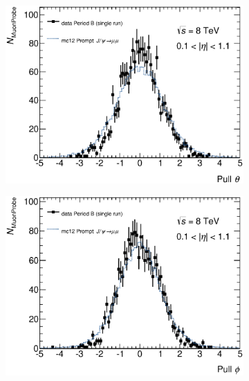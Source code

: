 \begin{figure}[htbp]
  \centering
    \begin{subfigure}[b]{0.49\textwidth}
      \includegraphics[width=\textwidth]{PartCalibration2012/Plots/DiscrepancyStudy/Pull/h_pull_theta_Nominal.eps}
      \caption{}\label{fig:CalibrationPullEta}
    \end{subfigure}
    \hfill
    \begin{subfigure}[b]{0.49\textwidth}
      \includegraphics[width=\textwidth]{PartCalibration2012/Plots/DiscrepancyStudy/Pull/h_pull_phi_Nominal.eps}
      \caption{}\label{fig:CalibrationPullPhi}
    \end{subfigure}


\end{figure}
